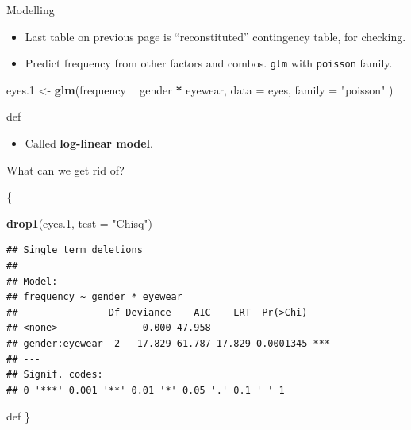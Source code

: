 \documentclass[ignorenonframetext,]{beamer}
\newenvironment{Shaded}{\begin{snugshade}}{\end{snugshade}}
\newcommand{\DataTypeTok}[1]{\textcolor[rgb]{0.13,0.29,0.53}{#1}}
\newcommand{\FloatTok}[1]{\textcolor[rgb]{0.00,0.00,0.81}{#1}}
\newcommand{\KeywordTok}[1]{\textcolor[rgb]{0.13,0.29,0.53}{\textbf{#1}}}
\newcommand{\NormalTok}[1]{#1}
\newcommand{\OperatorTok}[1]{\textcolor[rgb]{0.81,0.36,0.00}{\textbf{#1}}}
\newcommand{\StringTok}[1]{\textcolor[rgb]{0.31,0.60,0.02}{#1}}
\providecommand{\tightlist}{%
  \setlength{\itemsep}{0pt}\setlength{\parskip}{0pt}}
\begin{document}
\begin{frame}[fragile]{Modelling}
\protect\hypertarget{modelling}{}

\begin{itemize}
\item
  Last table on previous page is ``reconstituted'' contingency table,
  for checking.
\item
  Predict frequency from other factors and combos. \texttt{glm} with
  \texttt{poisson} family.
\end{itemize}

\begin{Shaded}
\begin{Highlighting}[]
\NormalTok{eyes}\FloatTok{.1}\NormalTok{ <-}\StringTok{ }\KeywordTok{glm}\NormalTok{(frequency }\OperatorTok{~}\StringTok{ }\NormalTok{gender }\OperatorTok{*}\StringTok{ }\NormalTok{eyewear,}
  \DataTypeTok{data =}\NormalTok{ eyes,}
  \DataTypeTok{family =} \StringTok{"poisson"}
\NormalTok{)}
\end{Highlighting}
\end{Shaded}

def

\begin{itemize}
\tightlist
\item
  Called \textbf{log-linear model}.
\end{itemize}

\end{frame}

\begin{frame}[fragile]{What can we get rid of?}
\protect\hypertarget{what-can-we-get-rid-of}{}

\{\small    

\begin{Shaded}
\begin{Highlighting}[]
\KeywordTok{drop1}\NormalTok{(eyes}\FloatTok{.1}\NormalTok{, }\DataTypeTok{test =} \StringTok{"Chisq"}\NormalTok{)}
\end{Highlighting}
\end{Shaded}

\begin{verbatim}
## Single term deletions
## 
## Model:
## frequency ~ gender * eyewear
##                Df Deviance    AIC    LRT  Pr(>Chi)    
## <none>               0.000 47.958                     
## gender:eyewear  2   17.829 61.787 17.829 0.0001345 ***
## ---
## Signif. codes:  
## 0 '***' 0.001 '**' 0.01 '*' 0.05 '.' 0.1 ' ' 1
\end{verbatim}

def \}

\end{frame}
\end{document}
